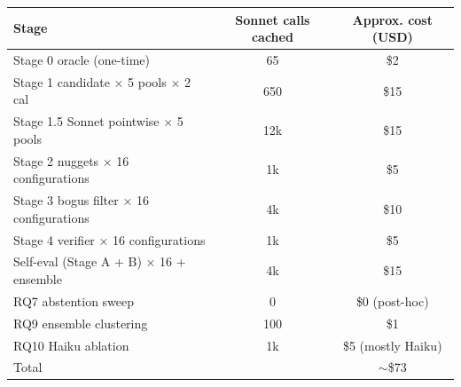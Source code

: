 \documentclass[11pt,a4paper]{article}
\begin{document}
\begin{tabular}{lcc}
\toprule
Stage & Sonnet calls cached & Approx. cost (USD) \\
\midrule
Stage 0 oracle (one-time)         & 65    & \$2 \\
Stage 1 candidate × 5 pools × 2 cal & 650 & \$15 \\
Stage 1.5 Sonnet pointwise × 5 pools & 12k & \$15 \\
Stage 2 nuggets × 16 configurations & 1k  & \$5 \\
Stage 3 bogus filter × 16 configurations & 4k & \$10 \\
Stage 4 verifier × 16 configurations & 1k  & \$5 \\
Self-eval (Stage A + B) × 16 + ensemble & 4k & \$15 \\
RQ7 abstention sweep              & 0     & \$0 (post-hoc) \\
RQ9 ensemble clustering           & 100   & \$1 \\
RQ10 Haiku ablation               & 1k    & \$5 (mostly Haiku) \\
\midrule
Total                                            &       & $\sim$\$73 \\
\bottomrule
\end{tabular}
\end{document}
